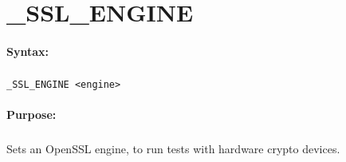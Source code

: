
\newpage
\section{\_SSL\_ENGINE}
\label{cmd:_SSL_ENGINE}

\paragraph{Syntax:}
\subparagraph{}
\texttt{\_SSL\_ENGINE <engine>}

\paragraph{Purpose:}
\subparagraph{}
Sets an OpenSSL engine, to run tests with hardware 
crypto devices.